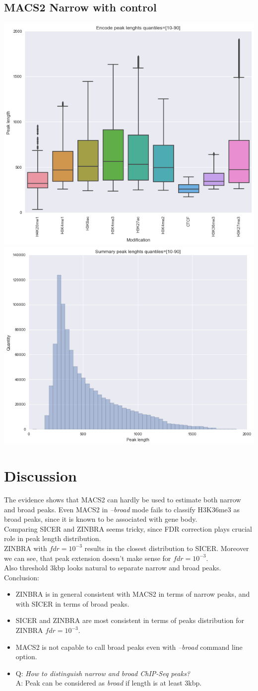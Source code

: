 \documentclass{article}
\begin{document}
\subsection{MACS2 Narrow with control}
\includegraphics[width=0.5\linewidth]{macs2control.png}
\includegraphics[width=0.5\linewidth]{macs2control2.png}

\section{Discussion}
The evidence shows that MACS2 can hardly be used to estimate both narrow and broad peaks. Even MACS2 in \textit{--broad} mode fails to classify H3K36me3 as broad peaks, since it is known to be associated with gene body.\\
Comparing SICER and ZINBRA seems tricky, since FDR correction plays crucial role in peak length distribution. \\
ZINBRA with $fdr=10^{-3}$ results in the closest distribution to SICER. Moreover we can see, that peak extension doesn't make sense for $fdr=10^{-3}$.\\ Also threshold 3kbp looks natural to separate narrow and broad peaks.\\

Conclusion:
\begin{itemize}
\item ZINBRA is in general consistent with MACS2 in terms of narrow peaks, and with SICER in terms of broad peaks.
\item SICER and ZINBRA are most consistent in terms of peaks distribution for ZINBRA $fdr=10^{-3}$.
\item MACS2 is not capable to call broad peaks even with \textit{--broad} command line option.
\item {Q: \textit{How to distinguish narrow and broad ChIP-Seq peaks?}\\
A: Peak can be considered as \textit{broad} if length is at least 3kbp.
}
\end{itemize} 
\end{document}
